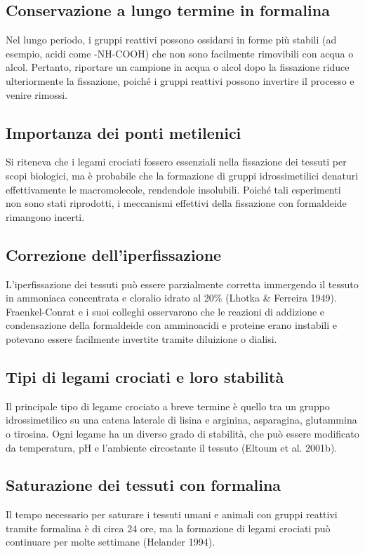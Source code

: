\subsection{Conservazione a lungo termine in formalina}
Nel lungo periodo, i gruppi reattivi possono ossidarsi in forme più stabili (ad esempio, acidi come -NH-COOH) che non sono facilmente rimovibili con acqua o alcol. Pertanto, riportare un campione in acqua o alcol dopo la fissazione riduce ulteriormente la fissazione, poiché i gruppi reattivi possono invertire il processo e venire rimossi.

\subsection{Importanza dei ponti metilenici}
Si riteneva che i legami crociati fossero essenziali nella fissazione dei tessuti per scopi biologici, ma è probabile che la formazione di gruppi idrossimetilici denaturi effettivamente le macromolecole, rendendole insolubili. Poiché tali esperimenti non sono stati riprodotti, i meccanismi effettivi della fissazione con formaldeide rimangono incerti.

\subsection{Correzione dell'iperfissazione}
L'iperfissazione dei tessuti può essere parzialmente corretta immergendo il tessuto in ammoniaca concentrata e cloralio idrato al 20\% (Lhotka \& Ferreira 1949). Fraenkel-Conrat e i suoi colleghi osservarono che le reazioni di addizione e condensazione della formaldeide con amminoacidi e proteine erano instabili e potevano essere facilmente invertite tramite diluizione o dialisi.

\subsection{Tipi di legami crociati e loro stabilità}
Il principale tipo di legame crociato a breve termine è quello tra un gruppo idrossimetilico su una catena laterale di lisina e arginina, asparagina, glutammina o tirosina. Ogni legame ha un diverso grado di stabilità, che può essere modificato da temperatura, pH e l'ambiente circostante il tessuto (Eltoum et al. 2001b).

\subsection{Saturazione dei tessuti con formalina}
Il tempo necessario per saturare i tessuti umani e animali con gruppi reattivi tramite formalina è di circa 24 ore, ma la formazione di legami crociati può continuare per molte settimane (Helander 1994).

